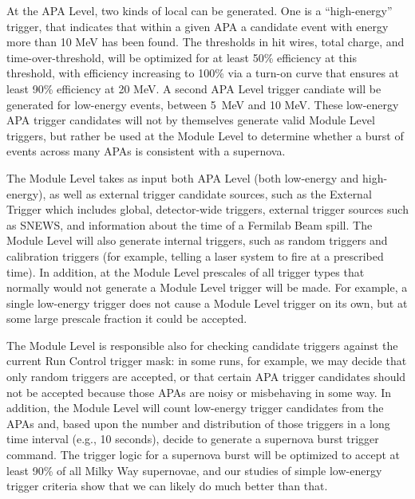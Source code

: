 	At the APA Level, two kinds of local  can be
generated. One is a ``high-energy'' trigger, that indicates that within a given
APA a candidate event with energy more than 10 MeV has been found. The
thresholds in hit wires, total charge, and time-over-threshold, will be
optimized for at least 50\% efficiency at this threshold, with efficiency
increasing to 100\% via a turn-on curve that ensures at least 90\% efficiency
at 20 MeV.  A second APA Level trigger candiate will be generated for
low-energy events, between 5~MeV and 10 MeV. These low-energy APA trigger
candidates will not by themselves generate valid  Module Level triggers, but
rather be used at the Module Level to determine whether a burst of events
across many APAs is consistent with a supernova.

	The Module Level takes as input both APA Level  (both
low-energy and high-energy), as well as external trigger candidate sources,
such as the External Trigger which includes global, detector-wide triggers,
external trigger sources such as SNEWS, and information about the time of a
Fermilab Beam spill.  The Module Level will also generate internal triggers,
such as random triggers and calibration triggers (for example, telling a laser
system to fire at a prescribed time).  In addition, at the Module Level
prescales of all trigger types that normally would not generate a Module Level
trigger will be made.  For example, a single low-energy trigger does not cause
a Module Level trigger on its own, but at some large prescale fraction it could
be accepted.



	The Module Level is responsible also for checking candidate triggers
against the current Run Control trigger mask: in some runs, for example, we
may decide that only random triggers are accepted, or that certain APA trigger
candidates should not be accepted because those APAs are noisy or misbehaving
in some way.  In addition, the Module Level will count low-energy trigger
candidates from the APAs and, based upon the number and distribution of those
triggers in a long time interval (e.g., 10 seconds), decide to generate a
supernova burst trigger command. The trigger logic for a supernova burst will
be optimized to accept at least 90\% of all Milky Way supernovae, and our
studies of simple low-energy trigger criteria show that we can likely do much
better than that.  

